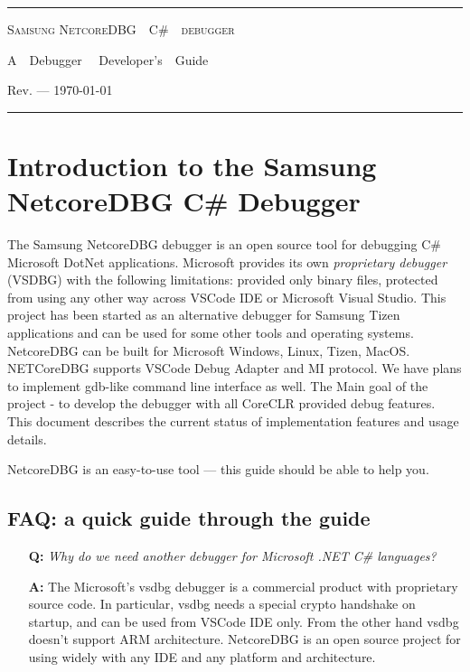 \documentclass[a4paper,12pt]{article}
\newenvironment{nobr}{\begin{minipage}{\textwidth}\setlength\parskip{1em}
}{\end{minipage}\ignorespacesafterend}
\begin{document}
\begin{center}
\hrule\bigskip\bigskip
{\Huge\textsc{Samsung NetcoreDBG\ \ C\#\ \ debugger}}
\bigskip

{\Large A\ \ Debugger \ \ Developer's\ \ Guide}
\bigskip

{Rev. --- \today}
\bigskip\bigskip\hrule

\end{center}

\newpage
\tableofcontents

\newpage
\section{Introduction to the Samsung NetcoreDBG C\# Debugger}\label{sec:intro}

The Samsung NetcoreDBG debugger is an open source tool for debugging C\# Microsoft DotNet applications. Microsoft provides its own \emph{proprietary debugger} (VSDBG) with the following limitations: provided only binary files, protected from using any other way across VSCode IDE or Microsoft Visual Studio. This project has been started as an alternative debugger for Samsung Tizen applications and can be used for some other tools and operating systems. NetcoreDBG can be built for Microsoft Windows, Linux, Tizen, MacOS. NETCoreDBG supports VSCode Debug Adapter and MI protocol. We have plans to implement gdb-like command line interface as well. The Main goal of the project - to develop the debugger with all CoreCLR provided debug features. This document describes the current status of implementation features and usage details.

NetcoreDBG is an easy-to-use tool --- this guide should be able to help you.

\newpage
\subsection{FAQ: a quick guide through the guide}

\begin{nobr}
\begin{itemize}
\item[\textbf{Q:}] \emph{Why do we need another debugger for Microsoft .NET C\# languages?}
\item[\textbf{A:}] The Microsoft's vsdbg debugger is a commercial product with proprietary source code. In particular, vsdbg needs a special crypto handshake on startup, and can be used from VSCode IDE only. From the other hand vsdbg doesn't support ARM architecture. NetcoreDBG is an open source project for using widely with any IDE and any platform and architecture.
\end{itemize}
\medskip
\end{nobr}
\end{document}
